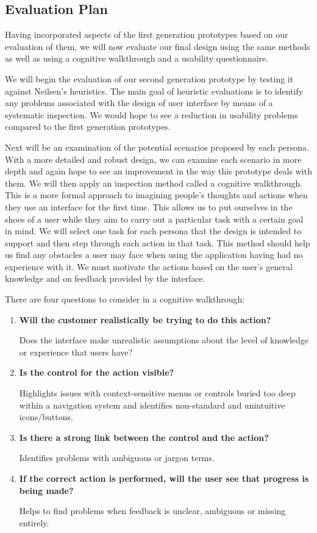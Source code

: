 \subsection{Evaluation Plan}
\label{sub:evaluation_plan}

Having incorporated aspects of the first generation prototypes based on our
evaluation of them, we will now evaluate our final design using the same
methods as well as using a cognitive walkthrough and a usability questionnaire.

We will begin the evaluation of our second generation prototype by testing it
against Neilsen's heuristics. The main goal of heuristic evaluations is to
identify any problems associated with the design of user interface by means of
a systematic inspection. We would hope to see a reduction in usability problems
compared to the first generation prototypes.

Next will be an examination of the potential scenarios proposed by each
persona. With a more detailed and robust design, we can examine each scenario
in more depth and again hope to see an improvement in the way this prototype
deals with them. We will then apply an inspection method called a cognitive
walkthrough. This is a more formal approach to imagining people's thoughts and
actions when they use an interface for the first time. This allows us to put
ourselves in the shoes of a user while they aim to carry out a particular task
with a certain goal in mind. We will select one task for each persona that the
design is intended to support and then step through each action in that task.
This method should help us find any obstacles a user may face when using the
application having had no experience with it. We must motivate the actions
based on the user's general knowledge and on feedback provided by the
interface.

There are four questions to consider in a cognitive walkthrough\cite{cogwalk}:
\begin{enumerate}
	\item \textbf{Will the customer realistically be trying to do this action?}

	Does the interface make unrealistic assumptions about the level of
	knowledge or experience that users have?

	\item \textbf{Is the control for the action visible?}

	Highlights issues with context-sensitive menus or controls buried too deep
	within a navigation system and identifies non-standard and unintuitive
	icons/buttons.

	\item \textbf{Is there a strong link between the control and the action?}

	Identifies problems with ambiguous or jargon terms.

	\item \textbf{If the correct  action is performed, will the user see that
		progress is being made?}

	Helps to find problems when feedback is unclear, ambiguous or missing
	entirely.

\end{enumerate}
\bigskip

